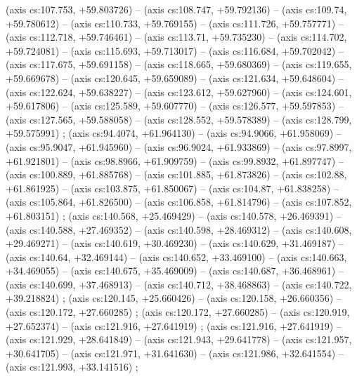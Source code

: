     (axis cs:107.753,    +59.803726) --  (axis cs:108.747,    +59.792136) --  (axis cs:109.74,    +59.780612) --  (axis cs:110.733,    +59.769155) --  (axis cs:111.726,    +59.757771) --  (axis cs:112.718,    +59.746461) --  (axis cs:113.71,    +59.735230) --  (axis cs:114.702,    +59.724081) --  (axis cs:115.693,    +59.713017) --  (axis cs:116.684,    +59.702042) --  (axis cs:117.675,    +59.691158) --  (axis cs:118.665,    +59.680369) --  (axis cs:119.655,    +59.669678) --  (axis cs:120.645,    +59.659089) --  (axis cs:121.634,    +59.648604) --  (axis cs:122.624,    +59.638227) --  (axis cs:123.612,    +59.627960) --  (axis cs:124.601,    +59.617806) --  (axis cs:125.589,    +59.607770) --  (axis cs:126.577,    +59.597853) --  (axis cs:127.565,    +59.588058) --  (axis cs:128.552,    +59.578389) --  (axis cs:128.799,    +59.575991) ;
    (axis cs:94.4074,    +61.964130) --  (axis cs:94.9066,    +61.958069) --  (axis cs:95.9047,    +61.945960) --  (axis cs:96.9024,    +61.933869) --  (axis cs:97.8997,    +61.921801) --  (axis cs:98.8966,    +61.909759) --  (axis cs:99.8932,    +61.897747) --  (axis cs:100.889,    +61.885768) --  (axis cs:101.885,    +61.873826) --  (axis cs:102.88,    +61.861925) --  (axis cs:103.875,    +61.850067) --  (axis cs:104.87,    +61.838258) --  (axis cs:105.864,    +61.826500) --  (axis cs:106.858,    +61.814796) --  (axis cs:107.852,    +61.803151) ;
    (axis cs:140.568,    +25.469429) --  (axis cs:140.578,    +26.469391) --  (axis cs:140.588,    +27.469352) --  (axis cs:140.598,    +28.469312) --  (axis cs:140.608,    +29.469271) --  (axis cs:140.619,    +30.469230) --  (axis cs:140.629,    +31.469187) --  (axis cs:140.64,    +32.469144) --  (axis cs:140.652,    +33.469100) --  (axis cs:140.663,    +34.469055) --  (axis cs:140.675,    +35.469009) --  (axis cs:140.687,    +36.468961) --  (axis cs:140.699,    +37.468913) --  (axis cs:140.712,    +38.468863) --  (axis cs:140.722,    +39.218824) ;
    (axis cs:120.145,    +25.660426) --  (axis cs:120.158,    +26.660356) --  (axis cs:120.172,    +27.660285) ;
    (axis cs:120.172,    +27.660285) --  (axis cs:120.919,    +27.652374) --  (axis cs:121.916,    +27.641919) ;
    (axis cs:121.916,    +27.641919) --  (axis cs:121.929,    +28.641849) --  (axis cs:121.943,    +29.641778) --  (axis cs:121.957,    +30.641705) --  (axis cs:121.971,    +31.641630) --  (axis cs:121.986,    +32.641554) --  (axis cs:121.993,    +33.141516) ;
